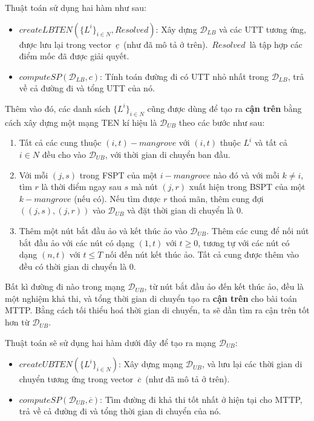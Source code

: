 \documentclass[../main.tex]{subfiles}
\begin{document}
Thuật toán sử dụng hai hàm như sau:

\begin{itemize}
\tightlist
\item
  \(createLBTEN(\{L^i\}_{i\in N}, Resolved)\): Xây dựng
  \(\mathcal D_{LB}\) và các UTT tương ứng, được lưu lại trong
  vector~\(\underline{c}\)~(như đã mô tả ở trên).~\(Resolved\)~là tập
  hợp các điểm mốc đã được giải quyết.
\item
  \(computeSP(\mathcal D_{LB},c)\): Tính toán đường đi có UTT nhỏ nhất
  trong \(\mathcal D_{LB}\), trả về cả đường đi và tổng UTT của nó.
\end{itemize}

Thêm vào đó, các danh sách \(\{L^i\}_{i\in N}\) cũng được dùng để tạo ra
\textbf{cận trên} bằng cách xây dựng một mạng TEN kí hiệu là
\(\mathcal D_{UB}\) theo các bước như sau:

\begin{enumerate}
\def\labelenumi{\arabic{enumi}.}
\tightlist
\item
  Tất cả các cung thuộc \((i,t)-mangrove\) với \((i,t)\) thuộc \(L^i\)
  và tất cả \(i\in N\) đều cho vào \(\mathcal D_{UB}\), với thời gian di
  chuyển ban đầu.
\item
  Với mỗi \((j,s)\) trong FSPT của một \(i-mangrove\) nào đó và với mỗi
  \(k\neq i\), tìm \(r\) là thời điểm ngay sau \(s\) mà nút \((j,r)\)
  xuất hiện trong BSPT của một \(k-mangrove\) (nếu có). Nếu tìm được
  \(r\) thoả mãn, thêm cung đợi \(((j, s), (j, r))\) vào
  \(\mathcal D_{UB}\) và đặt thời gian di chuyển là \(0\).
\item
  Thêm một nút bắt đầu ảo và kết thúc ảo vào \(\mathcal D_{UB}\). Thêm
  các cung để nối nút bắt đầu ảo với các nút có dạng \((1,t)\) với
  \(t\geq 0\), tương tự với các nút có dạng \((n,t)\) với \(t\leq T\)
  nối đến nút kết thúc ảo. Tất cả cung được thêm vào đều có thời gian di
  chuyển là \(0\).
\end{enumerate}

Bất kì đường đi nào trong mạng \(\mathcal D_{UB}\), từ nút bắt đầu ảo
đến kết thúc ảo, đều là một nghiệm khả thi, và tổng thời gian di chuyển
tạo ra \textbf{cận trên} cho bài toán MTTP. Bằng cách tối thiểu hoá thời
gian di chuyển, ta sẽ dần tìm ra cận trên tốt hơn từ
\(\mathcal D_{UB}\).

Thuật toán sẽ sử dụng hai hàm dưới đây để tạo ra mạng
\(\mathcal D_{UB}\):

\begin{itemize}
\tightlist
\item
  \(createUBTEN(\{L^i\}_{i\in N})\): Xây dựng mạng \(\mathcal D_{UB}\),
  và lưu lại các thời gian di chuyển tương ứng trong
  vector~\(\overline{c}\)~(như đã mô tả ở trên).
\item
  \(computeSP(\mathcal D_{UB},\overline{c})\): Tìm đường đi khả thi tốt
  nhất ở hiện tại cho MTTP, trả về cả đường đi và tổng thời gian di
  chuyển của nó.
\end{itemize}
\end{document}
